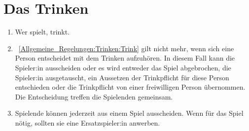 \section{Das Trinken}
\begin{enumerate}[label={(\arabic*)}]
	\item\label{Allgemeine_Regelungen:Trinken:Trink}
	Wer spielt, trinkt.
	
	\item
	~\ref{Allgemeine_Regelungen:Trinken:Trink} gilt nicht mehr, wenn sich eine Person entscheidet mit dem Trinken aufzuhören.
	In diesem Fall kann die Spieler:in ausscheiden oder es wird entweder das Spiel abgebrochen, die Spieler:in ausgetauscht, ein Aussetzen der Trinkpflicht für diese Person entschieden oder die Trinkpflicht von einer freiwilligen Person übernommen.
	Die Entscheidung treffen die Spielenden gemeinsam.
	
	\item
	Spielende können jederzeit aus einem Spiel ausscheiden. Wenn für das Spiel nötig, sollten sie eine Ersatzspieler:in anwerben.
\end{enumerate}

